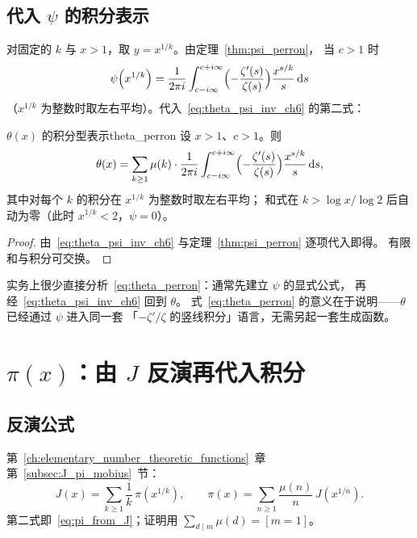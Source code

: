 \subsection{代入 $\psi$ 的积分表示}

对固定的 $k$ 与 $x>1$，取 $y=x^{1/k}$。由定理~\ref{thm:psi_perron}，
当 $c>1$ 时
\[
  \psi\!\left(x^{1/k}\right)
  =\frac{1}{2\pi i}
  \int_{c-i\infty}^{c+i\infty}
  \Bigl(-\frac{\zeta'(s)}{\zeta(s)}\Bigr)
  \frac{x^{s/k}}{s}\,\mathrm{d}s
\]
（$x^{1/k}$ 为整数时取左右平均）。代入~\eqref{eq:theta_psi_inv_ch6} 的第二式：

\begin{theorem}{$\theta(x)$ 的积分型表示}{theta_perron}
设 $x>1$、$c>1$。则
\begin{equation}
  \theta(x)
  =\sum_{k\ge 1}\mu(k)\cdot
  \frac{1}{2\pi i}
  \int_{c-i\infty}^{c+i\infty}
  \Bigl(-\frac{\zeta'(s)}{\zeta(s)}\Bigr)
  \frac{x^{s/k}}{s}\,\mathrm{d}s,
  \label{eq:theta_perron}
\end{equation}
其中对每个 $k$ 的积分在 $x^{1/k}$ 为整数时取左右平均；
和式在 $k>\log x/\log 2$ 后自动为零（此时 $x^{1/k}<2$，$\psi=0$）。
\end{theorem}

\begin{proof}
由~\eqref{eq:theta_psi_inv_ch6} 与定理~\ref{thm:psi_perron} 逐项代入即得。
有限和与积分可交换。
\end{proof}

实务上很少直接分析~\eqref{eq:theta_perron}：通常先建立 $\psi$ 的显式公式，
再经~\eqref{eq:theta_psi_inv_ch6} 回到 $\theta$。
式~\eqref{eq:theta_perron} 的意义在于说明——$\theta$ 已经通过 $\psi$ 进入同一套
「$-\zeta'/\zeta$ 的竖线积分」语言，无需另起一套生成函数。


\section{\texorpdfstring{$\pi(x)$}{pi(x)}：由 \texorpdfstring{$J$}{J} 反演再代入积分}
\label{sec:pi_integral}

\subsection{反演公式}

第~\ref{ch:elementary_number_theoretic_functions}~章第~\ref{subsec:J_pi_mobius}~节：
\begin{equation}
  J(x)=\sum_{k\ge 1}\frac{1}{k}\,\pi\!\left(x^{1/k}\right),
  \qquad
  \pi(x)=\sum_{n\ge 1}\frac{\mu(n)}{n}\,J\!\left(x^{1/n}\right).
  \label{eq:pi_J_inv_ch6}
\end{equation}
第二式即~\eqref{eq:pi_from_J}；证明用 $\sum_{d\mid m}\mu(d)=[m=1]$。

